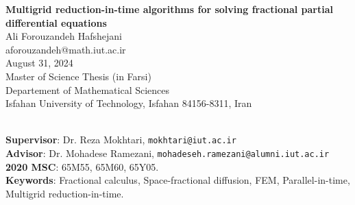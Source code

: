 \fancyhead[LO]{\nouppercase\rightmark\ \hfill\ \thepage}
\fancyhead[LE]{\nouppercase\rightmark\ \hfill\ \thepage}
\renewcommand{\baselinestretch}{.9}
\latin
\tnr
\vskip -1.1cm
\begin{center}
\textbf{Multigrid reduction-in-time algorithms for solving fractional partial differential equations}
\\
\medskip
Ali Forouzandeh Hafshejani
\\
aforouzandeh@math.iut.ac.ir
\\
August 31, 2024
\\
Master of Science  Thesis (in Farsi)
\\
Departement of Mathematical Sciences
\\
Isfahan University of Technology, Isfahan 84156-8311, Iran
\end{center}
\vskip -5.5mm
\hrulefill
\\
\noindent
\textbf{Supervisor}: Dr. Reza Mokhtari, \texttt{mokhtari@iut.ac.ir}
\\
\textbf{Advisor}: Dr. Mohadese Ramezani, \texttt{mohadeseh.ramezani@alumni.iut.ac.ir}
\\
\textbf{2020 MSC}: 65M55, 65M60, 65Y05.
\\
\textbf{Keywords}: Fractional calculus, Space-fractional diffusion, FEM, Parallel-in-time, Multigrid reduction-in-time.  

